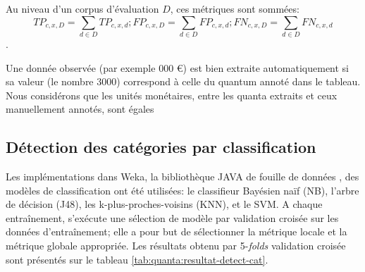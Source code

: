 Au niveau d'un corpus d'évaluation $D$, ces métriques sont sommées: 
\[TP_{c,x,D} = \sum\limits_{d \in D} TP_{c,x,d}; FP_{c,x,D} = \sum\limits_{d \in D} FP_{c,x,d}; FN_{c,x,D} = \sum\limits_{d \in D} FN_{c,x,d}\].

Une donnée observée (par exemple  000 \euro \fg) est bien extraite automatiquement si sa valeur (le nombre $3000$) correspond à celle du quantum annoté dans le tableau. Nous considérons que les unités monétaires, entre les quanta extraits et ceux manuellement annotés, sont égales




\subsection{Détection des catégories par classification}
Les implémentations dans Weka, la bibliothèque JAVA de fouille de données \cite{frank2016weka}, des modèles de classification ont été utilisées: le classifieur Bayésien naïf (NB), l'arbre de décision (J48), les k-plus-proches-voisins (KNN), et le SVM.
 A chaque entraînement, s'exécute une sélection de modèle par validation croisée sur les données d'entraînement; elle a pour but de sélectionner la métrique locale et la métrique globale appropriée. Les résultats obtenu par 5-\textit{folds} validation croisée sont présentés sur le tableau \ref{tab:quanta:resultat-detect-cat}.  
 
